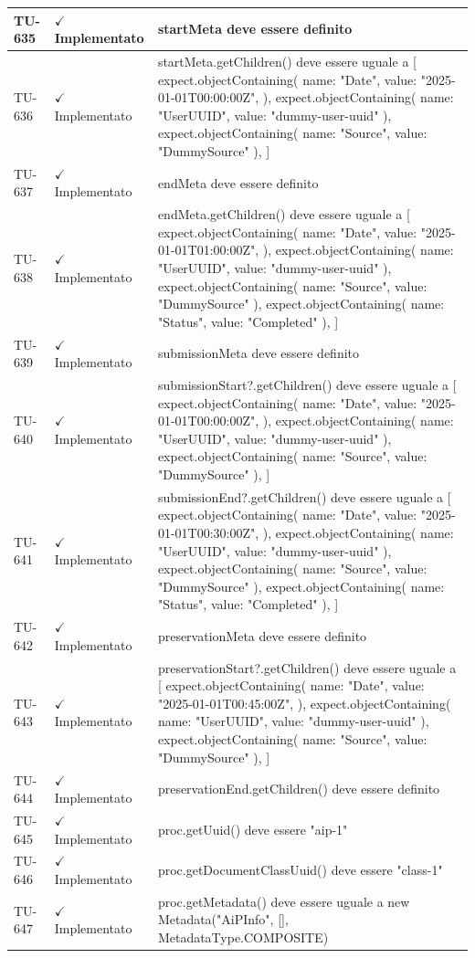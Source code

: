 ﻿\documentclass[a4paper,12pt]{article}
\newcommand{\ok}{\textcolor{green!60!black}{$\checkmark$ Implementato}}
\begin{document}
\begin{longtable}{|p{2cm}|p{3.5cm}|p{9.5cm}|}
\hline
TU-635 & \ok & startMeta deve essere definito \\
\hline
TU-636 & \ok & startMeta.getChildren() deve essere uguale a [ expect.objectContaining({ name: "Date", value: "2025-01-01T00:00:00Z", }), expect.objectContaining({ name: "UserUUID", value: "dummy-user-uuid" }), expect.objectContaining({ name: "Source", value: "DummySource" }), ] \\
\hline
TU-637 & \ok & endMeta deve essere definito \\
\hline
TU-638 & \ok & endMeta.getChildren() deve essere uguale a [ expect.objectContaining({ name: "Date", value: "2025-01-01T01:00:00Z", }), expect.objectContaining({ name: "UserUUID", value: "dummy-user-uuid" }), expect.objectContaining({ name: "Source", value: "DummySource" }), expect.objectContaining({ name: "Status", value: "Completed" }), ] \\
\hline
TU-639 & \ok & submissionMeta deve essere definito \\
\hline
TU-640 & \ok & submissionStart?.getChildren() deve essere uguale a [ expect.objectContaining({ name: "Date", value: "2025-01-01T00:00:00Z", }), expect.objectContaining({ name: "UserUUID", value: "dummy-user-uuid" }), expect.objectContaining({ name: "Source", value: "DummySource" }), ] \\
\hline
TU-641 & \ok & submissionEnd?.getChildren() deve essere uguale a [ expect.objectContaining({ name: "Date", value: "2025-01-01T00:30:00Z", }), expect.objectContaining({ name: "UserUUID", value: "dummy-user-uuid" }), expect.objectContaining({ name: "Source", value: "DummySource" }), expect.objectContaining({ name: "Status", value: "Completed" }), ] \\
\hline
TU-642 & \ok & preservationMeta deve essere definito \\
\hline
TU-643 & \ok & preservationStart?.getChildren() deve essere uguale a [ expect.objectContaining({ name: "Date", value: "2025-01-01T00:45:00Z", }), expect.objectContaining({ name: "UserUUID", value: "dummy-user-uuid" }), expect.objectContaining({ name: "Source", value: "DummySource" }), ] \\
\hline
TU-644 & \ok & preservationEnd.getChildren() deve essere definito \\
\hline
TU-645 & \ok & proc.getUuid() deve essere "aip-1" \\
\hline
TU-646 & \ok & proc.getDocumentClassUuid() deve essere "class-1" \\
\hline
TU-647 & \ok & proc.getMetadata() deve essere uguale a new Metadata("AiPInfo", [], MetadataType.COMPOSITE) \\

\end{longtable}
\end{document}
